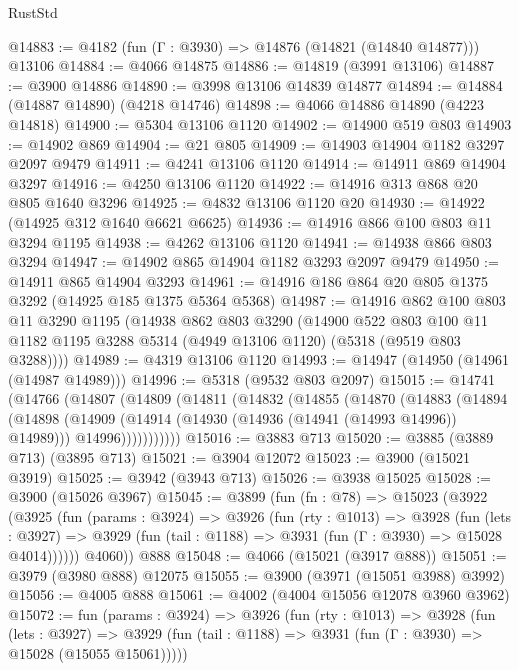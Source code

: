 \begin{lexlean}{RustStd}
\begin{coremodule}
@14883 := @4182 (fun (Γ : @3930) => @14876 (@14821 (@14840 @14877))) @13106
@14884 := @4066 @14875
@14886 := @14819 (@3991 @13106)
@14887 := @3900 @14886
@14890 := @3998 @13106 @14839 @14877
@14894 := @14884 (@14887 @14890) (@4218 @14746)
@14898 := @4066 @14886 @14890 (@4223 @14818)
@14900 := @5304 @13106 @1120
@14902 := @14900 @519 @803
@14903 := @14902 @869
@14904 := @21 @805
@14909 := @14903 @14904 @1182 @3297 @2097 @9479
@14911 := @4241 @13106 @1120
@14914 := @14911 @869 @14904 @3297
@14916 := @4250 @13106 @1120
@14922 := @14916 @313 @868 @20 @805 @1640 @3296
@14925 := @4832 @13106 @1120 @20
@14930 := @14922 (@14925 @312 @1640 @6621 @6625)
@14936 := @14916 @866 @100 @803 @11 @3294 @1195
@14938 := @4262 @13106 @1120
@14941 := @14938 @866 @803 @3294
@14947 := @14902 @865 @14904 @1182 @3293 @2097 @9479
@14950 := @14911 @865 @14904 @3293
@14961 := @14916 @186 @864 @20 @805 @1375 @3292 (@14925 @185 @1375 @5364 @5368)
@14987 := @14916
    @862
    @100
    @803
    @11
    @3290
    @1195
    (@14938
      @862
      @803
      @3290
      (@14900
        @522
        @803
        @100
        @11
        @1182
        @1195
        @3288
        @5314
        (@4949 @13106 @1120)
        (@5318 (@9519 @803 @3288))))
@14989 := @4319 @13106 @1120
@14993 := @14947 (@14950 (@14961 (@14987 @14989)))
@14996 := @5318 (@9532 @803 @2097)
@15015 := @14741
    (@14766
      (@14807
        (@14809
          (@14811
            (@14832
              (@14855
                (@14870
                  (@14883
                    (@14894
                      (@14898
                        (@14909
                          (@14914 (@14930 (@14936 (@14941 (@14993 @14996)) @14989)))
                          @14996)))))))))))
@15016 := @3883 @713
@15020 := @3885 (@3889 @713) (@3895 @713)
@15021 := @3904 @12072
@15023 := @3900 (@15021 @3919)
@15025 := @3942 (@3943 @713)
@15026 := @3938 @15025
@15028 := @3900 (@15026 @3967)
@15045 := @3899
    (fun (fn : @78) =>
    @15023
      (@3922
        (@3925
          (fun (params : @3924) =>
          @3926
            (fun (rty : @1013) =>
            @3928
              (fun (lets : @3927) =>
              @3929 (fun (tail : @1188) => @3931 (fun (Γ : @3930) => @15028 @4014))))))
        @4060))
    @888
@15048 := @4066 (@15021 (@3917 @888))
@15051 := @3979 (@3980 @888) @12075
@15055 := @3900 (@3971 (@15051 @3988) @3992)
@15056 := @4005 @888
@15061 := @4002 (@4004 @15056 @12078 @3960 @3962)
@15072 := fun (params : @3924) =>
  @3926
    (fun (rty : @1013) =>
    @3928
      (fun (lets : @3927) =>
      @3929 (fun (tail : @1188) => @3931 (fun (Γ : @3930) => @15028 (@15055 @15061)))))

\end{coremodule}
\end{lexlean}
